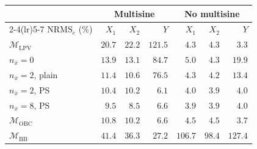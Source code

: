 \setlength{\tabcolsep}{3pt}
\begin{tabular}{l r r r r r r}
\toprule
 & \multicolumn{3}{c}{Multisine} & \multicolumn{3}{c}{No multisine}\\
\cmidrule(lr){2-4}\cmidrule(lr){5-7}
$\mathrm{NRMS}_e$ (\%) & $X_1$ & $X_2$ & $Y$ & $X_1$ & $X_2$ & $Y$\\
\midrule
$\mathcal{M}_{\mathrm{LPV}}$ & $20.7$ & $22.2$ & $121.5$ & $4.3$ & $4.3$ & $3.3$\\
$n_{\bar x}=0$ & $13.9$ & $13.1$ & $84.7$ & $5.0$ & $4.3$ & $19.9$\\
$n_{\bar x}=2$, plain & $11.4$ & $10.6$ & $76.5$ & $4.3$ & $4.2$ & $13.4$\\
$n_{\bar x}=2$, PS & $10.4$ & $10.2$ & $6.1$ & $4.0$ & $3.9$ & $4.0$\\
$n_{\bar x}=8$, PS & $9.5$ & $8.5$ & $6.6$ & $3.9$ & $3.9$ & $4.0$\\
\midrule
$\mathcal{M}_{\mathrm{OBC}}$ & $10.8$ & $10.2$ & $6.6$ & $4.5$ & $4.5$ & $3.7$\\
$\mathcal{M}_{\mathrm{BB}}$ & $41.4$ & $36.3$ & $27.2$ & $106.7$ & $98.4$ & $127.4$\\
\bottomrule
\end{tabular}
